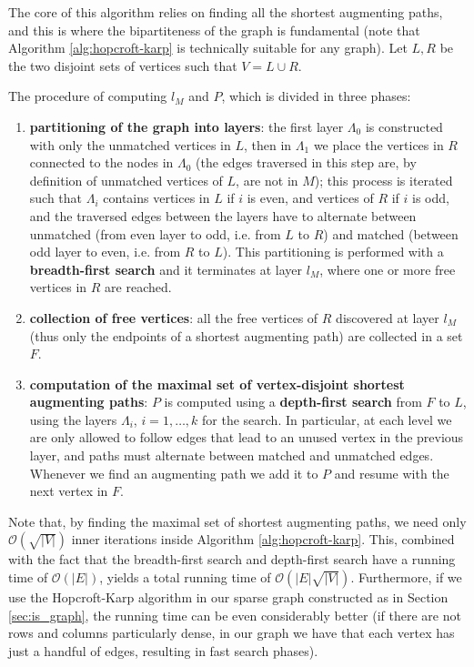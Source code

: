 The core of this algorithm relies on finding all the shortest augmenting paths, and this is where the bipartiteness of the graph is fundamental (note that Algorithm \ref{alg:hopcroft-karp} is technically suitable for any graph). Let $L,R$ be the two disjoint sets of vertices such that $V = L \cup R$.

The procedure of computing $l_M$ and $P$, which is divided in three phases:

\begin{enumerate}
	\item \textbf{partitioning of the graph into layers}: the first layer $\Lambda_0$ is constructed with only the unmatched vertices in $L$, then in $\Lambda_1$ we place the vertices in $R$ connected to the nodes in $\Lambda_0$ (the edges traversed in this step are, by definition of unmatched vertices of $L$, are not in $M$); this process is iterated such that $\Lambda_i$ contains vertices in $L$ if $i$ is even, and vertices of $R$ if $i$ is odd, and the traversed edges between the layers have to alternate between unmatched (from even layer to odd, i.e. from $L$ to $R$) and matched (between odd layer to even, i.e. from $R$ to $L$). This partitioning is performed with a \textbf{breadth-first search} and it terminates at layer $l_M$, where one or more free vertices in $R$ are reached.
	\item \textbf{collection of free vertices}: all the free vertices of $R$ discovered at layer $l_M$ (thus only the endpoints of a shortest augmenting path) are collected in a set $F$.
	\item \textbf{computation of the maximal set of vertex-disjoint shortest augmenting paths}: $P$ is computed using a \textbf{depth-first search} from $F$ to $L$, using the layers $\Lambda_i$, $i=1,\dots,k$ for the search. In particular, at each level we are only allowed to follow edges that lead to an unused vertex in the previous layer, and paths must alternate between matched and unmatched edges. Whenever we find an augmenting path we add it to $P$ and resume with the next vertex in $F$.
\end{enumerate}

Note that, by finding the maximal set of shortest augmenting paths, we need only $\mathcal{O}\left( \sqrt{|V|} \right)$ inner iterations inside Algorithm \ref{alg:hopcroft-karp}. This, combined with the fact that the breadth-first search and depth-first search have a running time of $\mathcal{O}(|E|)$, yields a total running time of $\mathcal{O} \left( |E|\sqrt{|V|} \right)$.
Furthermore, if we use the Hopcroft-Karp algorithm in our sparse graph constructed as in Section \ref{sec:is_graph}, the running time can be even considerably better (if there are not rows and columns particularly dense, in our graph we have that each vertex has just a handful of edges, resulting in fast search phases).

